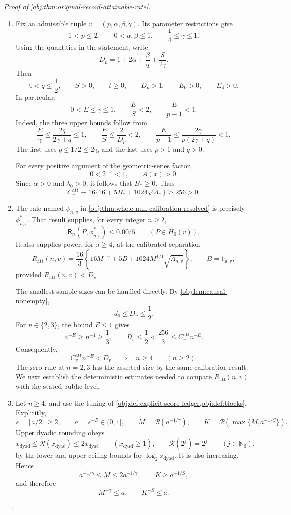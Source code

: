 \begin{proof}[Proof of \cref{obj:thm:original-record-attainable-rate}]
\begin{enumerate}
\item Fix an admissible tuple \(v=(p,\alpha,\beta,\gamma)\). Its parameter restrictions give
\[
1<p\le2,\qquad
0<\alpha,\beta\le1,\qquad
\frac14\le\gamma\le1.
\]
Using the quantities in the statement, write
\[
D_p=1+2\alpha+\frac{\beta}{q}+\frac{S}{2\gamma}.
\]
Then
\[
0<q\le\frac12,\qquad S>0,\qquad t\ge0,\qquad D_p>1,
\qquad E_0>0,\qquad E_4>0.
\]
In particular,
\[
0<E\le\gamma\le1,\qquad
\frac{E}{S}<2,\qquad
\frac{E}{p-1}<1.
\]
Indeed, the three upper bounds follow from
\[
\frac{E}{\gamma}
\le\frac{2q}{2\gamma+q}\le1,
\qquad
\frac{E}{S}\le\frac{2}{D_p}<2,
\qquad
\frac{E}{p-1}
\le\frac{2\gamma}{p(2\gamma+q)}<1.
\]
The first uses \(q\le1/2\le2\gamma\), and the last uses \(p>1\) and \(q>0\).

For every positive argument of the geometric-series factor,
\[
0<2^{-x}<1,\qquad A(x)>0.
\]
Since \(\alpha>0\) and \(\lambda_0>0\), it follows that \(B_*\ge0\). Thus
\[
C^{\mathrm{att}}_v
=16\{16+5B_*+1024\sqrt{A_*}\}
\ge256>0.
\]

\item The rule named \(\psi_{n,v}\) in
\cref{obj:thm:whole-null-calibration-resolved} is precisely
\(\phi^*_{n,v}\). That result supplies, for every integer \(n\ge2\),
\[
\mathsf R_n(P,\phi^*_{n,v})\le0.0075
\qquad(P\in H_0(v)).
\]
It also supplies power, for \(n\ge4\), at the calibrated separation
\[
R_{\mathrm{att}}(n,v)
=\frac{16}{3}
\left\{
16M^{-\gamma}+5B+1024M^{1/4}\sqrt{\Lambda_{n,v}}
\right\},
\qquad B=\mathfrak b_{n,v},
\]
provided \(R_{\mathrm{att}}(n,v)<D_v\).

The smallest sample sizes can be handled directly.
By \cref{obj:lem:causal-nonempty},
\[
d_0\le D_v\le\frac12.
\]
For \(n\in\{2,3\}\), the bound \(E\le1\) gives
\[
n^{-E}\ge n^{-1}\ge\frac13,
\qquad
D_v\le\frac12<\frac{256}{3}
\le C^{\mathrm{att}}_v n^{-E}.
\]
Consequently,
\[
C^{\mathrm{att}}_v n^{-E}<D_v
\quad\Longrightarrow\quad n\ge4
\qquad(n\ge2).
\]
The zero rule at \(n=2,3\) has the asserted size by the same calibration result.
We next establish the deterministic estimates needed to compare
\(R_{\mathrm{att}}(n,v)\) with the stated public level.

\item Let \(n\ge4\), and use the tuning of
\cref{obj:def:explicit-score-ledger,obj:def:blocks}. Explicitly,
\[
s=\lfloor n/2\rfloor\ge2,\qquad
a=s^{-E}\in(0,1],\qquad
M=\mathcal R(a^{-1/\gamma}),\qquad
K=\mathcal R\!\left(\max\{M,a^{-1/S}\}\right).
\]
Upper dyadic rounding obeys
\[
x_{\mathrm{dyad}}\le\mathcal R(x_{\mathrm{dyad}})
\le2x_{\mathrm{dyad}}
\qquad(x_{\mathrm{dyad}}\ge1),
\qquad
\mathcal R(2^j)=2^j\qquad(j\in\mathbb N_0),
\]
by the lower and upper ceiling bounds for \(\log_2 x_{\mathrm{dyad}}\).
It is also increasing. Hence
\[
a^{-1/\gamma}\le M\le2a^{-1/\gamma},
\qquad
K\ge a^{-1/S},
\]
and therefore
\[
M^{-\gamma}\le a,\qquad K^{-S}\le a.
\]


\end{enumerate}
\end{proof}
